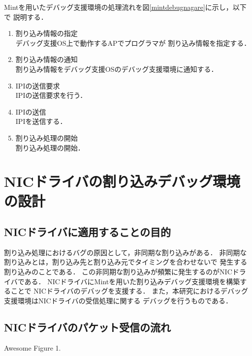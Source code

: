 \documentclass[tanilab-enum]{graduate}
\begin{document}
Mintを用いたデバッグ支援環境の処理流れを図\ref{mintdebugnagare}に示し，以下で
    説明する．
    \begin{enumerate}
        \item 割り込み情報の指定\\
            デバッグ支援OS上で動作するAPでプログラマが
            割り込み情報を指定する．
        \item 割り込み情報の通知\\
            割り込み情報をデバッグ支援OSのデバッグ支援環境に通知する．
        \item IPIの送信要求\\
            IPIの送信要求を行う．
        \item IPIの送信\\
            IPIを送信する．
        \item 割り込み処理の開始\\
            割り込み処理の開始．
    \end{enumerate}

\chapter{NICドライバの割り込みデバッグ環境の設計}\label{chap:plan}
\section{NICドライバに適用することの目的}
割り込み処理におけるバグの原因として，非同期な割り込みがある．
非同期な割り込みとは，割り込み先と割り込み元でタイミングを合わせないで
発生する割り込みのことである．
この非同期な割り込みが頻繁に発生するのがNICドライバである．
NICドライバにMintを用いた割り込みデバッグ支援環境を構築することで
NICドライバのデバッグを支援する．
また，本研究におけるデバッグ支援環境はNICドライバの受信処理に関する
デバッグを行うものである．
\section{NICドライバのパケット受信の流れ}
{Awesome Figure 1.}
\end{document}
